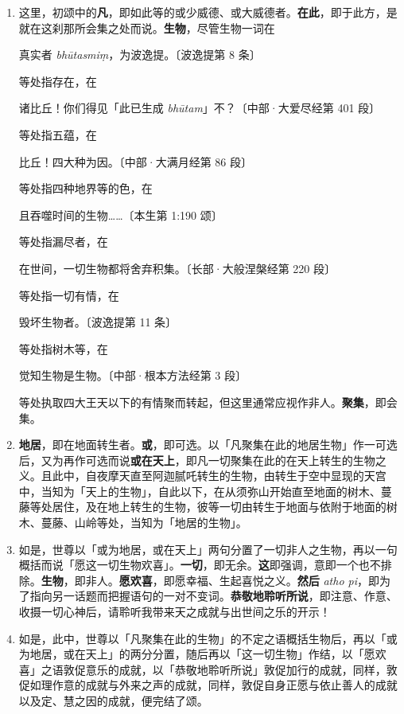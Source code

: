 \begin{enumerate}\item 这里，初颂中的\textbf{凡}，即如此等的或少威德、或大威德者。\textbf{在此}，即于此方，是就在这刹那所会集之处而说。\textbf{生物}，尽管生物一词在\begin{quoting}真实者 \textit{bhūtasmiṃ}，为波逸提。{\bluefootnotesize 〔波逸提第 8 条〕}\end{quoting}等处指存在，在\begin{quoting}诸比丘！你们得见「此已生成 \textit{bhūtam}」不？{\bluefootnotesize 〔中部·大爱尽经第 401 段〕}\end{quoting}等处指五蕴，在\begin{quoting}比丘！四大种为因。{\bluefootnotesize 〔中部·大满月经第 86 段〕}\end{quoting}等处指四种地界等的色，在\begin{quoting}且吞噬时间的生物……{\bluefootnotesize 〔本生第 1:190 颂〕}\end{quoting}等处指漏尽者，在\begin{quoting}在世间，一切生物都将舍弃积集。{\bluefootnotesize 〔长部·大般涅槃经第 220 段〕}\end{quoting}等处指一切有情，在\begin{quoting}毁坏生物者。{\bluefootnotesize 〔波逸提第 11 条〕}\end{quoting}等处指树木等，在\begin{quoting}觉知生物是生物。{\bluefootnotesize 〔中部·根本方法经第 3 段〕}\end{quoting}等处执取四大王天以下的有情聚而转起，但这里通常应视作非人。\textbf{聚集}，即会集。
\item \textbf{地居}，即在地面转生者。\textbf{或}，即可选。以「凡聚集在此的地居生物」作一可选后，又为再作可选而说\textbf{或在天上}，即凡一切聚集在此的在天上转生的生物之义。且此中，自夜摩天直至阿迦腻吒转生的生物，由转生于空中显现的天宫中，当知为「天上的生物」，自此以下，在从须弥山开始直至地面的树木、蔓藤等处居住，及在地上转生的生物，彼等一切由转生于地面与依附于地面的树木、蔓藤、山岭等处，当知为「地居的生物」。
\item 如是，世尊以「或为地居，或在天上」两句分置了一切非人之生物，再以一句概括而说「愿这一切生物欢喜」。\textbf{一切}，即无余。\textbf{这}即强调，意即一个也不排除。\textbf{生物}，即非人。\textbf{愿欢喜}，即愿幸福、生起喜悦之义。\textbf{然后} \textit{atho pi}，即为了指向另一话题而把握语句的一对不变词。\textbf{恭敬地聆听所说}，即注意、作意、收摄一切心神后，请聆听我带来天之成就与出世间之乐的开示！
\item 如是，此中，世尊以「凡聚集在此的生物」的不定之语概括生物后，再以「或为地居，或在天上」的两分分置，随后再以「这一切生物」作结，以「愿欢喜」之语敦促意乐的成就，以「恭敬地聆听所说」敦促加行的成就，同样，敦促如理作意的成就与外来之声的成就，同样，敦促自身正愿与依止善人的成就以及定、慧之因的成就，便完结了颂。\end{enumerate}

